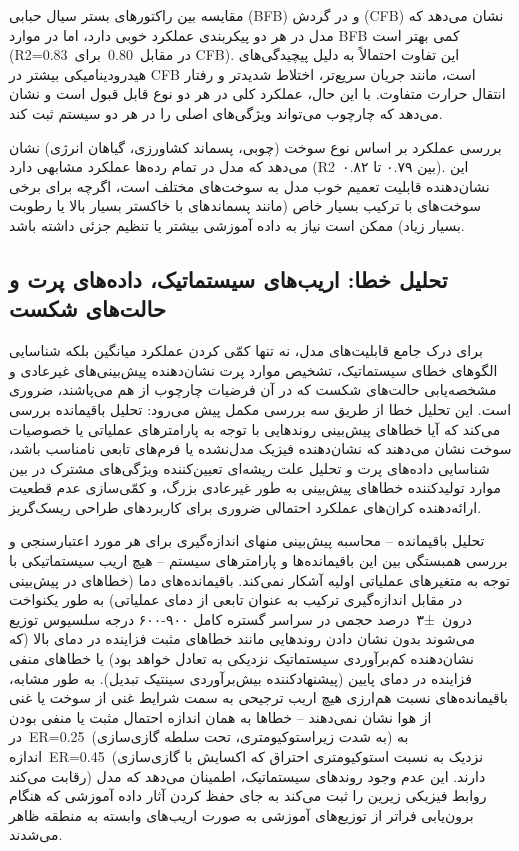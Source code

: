 \documentclass[12pt, a4paper]{article}
\begin{document}
مقایسه بین راکتورهای بستر سیال حبابی (BFB) و در گردش (CFB) نشان می‌دهد که مدل در هر دو پیکربندی عملکرد خوبی دارد، اما در موارد BFB کمی بهتر است (R2=0.83 در مقابل 0.80 برای CFB). این تفاوت احتمالاً به دلیل پیچیدگی‌های هیدرودینامیکی بیشتر در CFB است، مانند جریان سریع‌تر، اختلاط شدیدتر و رفتار انتقال حرارت متفاوت. با این حال، عملکرد کلی در هر دو نوع قابل قبول است و نشان می‌دهد که چارچوب می‌تواند ویژگی‌های اصلی را در هر دو سیستم ثبت کند.

بررسی عملکرد بر اساس نوع سوخت (چوبی، پسماند کشاورزی، گیاهان انرژی) نشان می‌دهد که مدل در تمام رده‌ها عملکرد مشابهی دارد (R2 بین ۰.۷۹ تا ۰.۸۲). این نشان‌دهنده قابلیت تعمیم خوب مدل به سوخت‌های مختلف است، اگرچه برای برخی سوخت‌های با ترکیب بسیار خاص (مانند پسماندهای با خاکستر بسیار بالا یا رطوبت بسیار زیاد) ممکن است نیاز به داده آموزشی بیشتر یا تنظیم جزئی داشته باشد.

\subsection{تحلیل خطا: اریب‌های سیستماتیک، داده‌های پرت و حالت‌های شکست}

برای درک جامع قابلیت‌های مدل، نه تنها کمّی کردن عملکرد میانگین بلکه شناسایی الگوهای خطای سیستماتیک، تشخیص موارد پرت نشان‌دهنده پیش‌بینی‌های غیرعادی و مشخصه‌یابی حالت‌های شکست که در آن فرضیات چارچوب از هم می‌پاشند، ضروری است. این تحلیل خطا از طریق سه بررسی مکمل پیش می‌رود: تحلیل باقیمانده بررسی می‌کند که آیا خطاهای پیش‌بینی روندهایی با توجه به پارامترهای عملیاتی یا خصوصیات سوخت نشان می‌دهند که نشان‌دهنده فیزیک مدل‌نشده یا فرم‌های تابعی نامناسب باشد، شناسایی داده‌های پرت و تحلیل علت ریشه‌ای تعیین‌کننده ویژگی‌های مشترک در بین موارد تولیدکننده خطاهای پیش‌بینی به طور غیرعادی بزرگ، و کمّی‌سازی عدم قطعیت ارائه‌دهنده کران‌های عملکرد احتمالی ضروری برای کاربردهای طراحی ریسک‌گریز.

تحلیل باقیمانده – محاسبه پیش‌بینی منهای اندازه‌گیری برای هر مورد اعتبارسنجی و بررسی همبستگی بین این باقیمانده‌ها و پارامترهای سیستم – هیچ اریب سیستماتیکی با توجه به متغیرهای عملیاتی اولیه آشکار نمی‌کند. باقیمانده‌های دما (خطاهای در پیش‌بینی در مقابل اندازه‌گیری ترکیب به عنوان تابعی از دمای عملیاتی) به طور یکنواخت درون ±۳ درصد حجمی در سراسر گستره کامل ۹۰۰-۶۰۰ درجه سلسیوس توزیع می‌شوند بدون نشان دادن روندهایی مانند خطاهای مثبت فزاینده در دمای بالا (که نشان‌دهنده کم‌برآوردی سیستماتیک نزدیکی به تعادل خواهد بود) یا خطاهای منفی فزاینده در دمای پایین (پیشنهادکننده بیش‌برآوردی سینتیک تبدیل). به طور مشابه، باقیمانده‌های نسبت هم‌ارزی هیچ اریب ترجیحی به سمت شرایط غنی از سوخت یا غنی از هوا نشان نمی‌دهند – خطاها به همان اندازه احتمال مثبت یا منفی بودن در ER=0.25 (به شدت زیراستوکیومتری، تحت سلطه گازی‌سازی) به اندازه ER=0.45 (نزدیک به نسبت استوکیومتری احتراق که اکسایش با گازی‌سازی رقابت می‌کند) دارند. این عدم وجود روندهای سیستماتیک، اطمینان می‌دهد که مدل روابط فیزیکی زیرین را ثبت می‌کند به جای حفظ کردن آثار داده آموزشی که هنگام برون‌یابی فراتر از توزیع‌های آموزشی به صورت اریب‌های وابسته به منطقه ظاهر می‌شدند.
\end{document}
